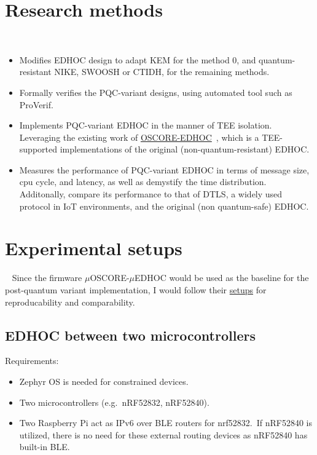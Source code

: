 \section{Research methods}
~\label{sec:research-methods}
\begin{itemize}
    \item Modifies EDHOC design to adapt KEM for the method 0, and quantum-resistant NIKE, SWOOSH or CTIDH,
    for the remaining methods.
    \item Formally verifies the PQC-variant designs, using automated tool such as ProVerif.
    \item Implements PQC-variant EDHOC in the manner of TEE isolation. Leveraging the existing work
    of \href{https://github.com/eriptic/uoscore-uedhoc}{{\textmu}OSCORE-{\textmu}EDHOC}~\cite{oscore-tee-performance},
    which is a TEE-supported implementations of the original (non-quantum-resistant) EDHOC\@.
    \item Measures the performance of PQC-variant EDHOC in terms of message size, cpu cycle,
    and latency, as well as demystify the time distribution. Additonally, compare its performance to that of DTLS, a widely used protocol in IoT
    environments, and the original (non quantum-safe) EDHOC\@.
\end{itemize}

\section{Experimental setups}
~\label{sec:experiment-setups}
Since the firmware $\mu$OSCORE-$\mu$EDHOC would be used as the baseline for the post-quantum
variant implementation, I would follow their \href{https://github.com/eriptic/uoscore-uedhoc/tree/main/samples/zephyr_edhoc}{setups}
for reproducability and comparability.

\subsection{EDHOC between two microcontrollers}
Requirements:
\begin{itemize}
    \item Zephyr OS is needed for constrained devices.
    \item Two microcontrollers (e.g.\ nRF52832, nRF52840).
    \item Two Raspberry Pi act as IPv6 over BLE routers for nrf52832.\ If nRF52840
    is utilized, there is no need for these external routing devices as nRF52840 has
    built-in BLE\@.
\end{itemize}
